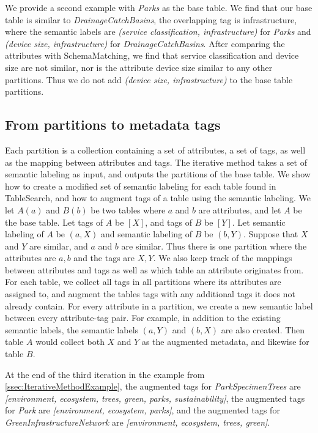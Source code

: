 We provide a second example with \textit{Parks} as the base table. We find that our base table is similar to \textit{DrainageCatchBasins}, the overlapping tag is infrastructure, where the semantic labels are \textit{(service classification, infrastructure)} for \textit{Parks} and \textit{(device size, infrastructure)} for \textit{DrainageCatchBasins}. After comparing the attributes with SchemaMatching, we find that service classification and device size are not similar, nor is the attribute device size similar to any other partitions. Thus we do not add \textit{(device size, infrastructure)} to the base table partitions.

\subsection{From partitions to metadata tags}
\label{ssec:FromPartitionsToMetadataTags}

Each partition is a collection containing a set of attributes, a set of tags, as well as the mapping between attributes and tags. The iterative method takes a set of semantic labeling as input, and outputs the partitions of the base table. We show how to create a modified set of semantic labeling for each table found in TableSearch, and how to augment tags of a table using the semantic labeling. We let $A(a)$ and $B(b)$ be two tables where $a$ and $b$ are attributes, and let $A$ be the base table. Let tags of $A$ be $[X]$, and tags of $B$ be $[Y]$. Let semantic labeling of $A$ be ${(a, X)}$ and semantic labeling of $B$ be ${(b, Y)}$. Suppose that $X$ and $Y$ are similar, and $a$ and $b$ are similar. Thus there is one partition where the attributes are ${a, b}$ and the tags are ${X, Y}$. We also keep track of the mappings between attributes and tags as well as which table an attribute originates from. For each table, we collect all tags in all partitions where its attributes are assigned to, and augment the tables tags with any additional tags it does not already contain. For every attribute in a partition, we create a new semantic label between every attribute-tag pair. For example, in addition to the existing semantic labels, the semantic labels $(a, Y)$ and $(b, X)$ are also created. Then table $A$ would collect both $X$ and $Y$ as the augmented metadata, and likewise for table $B$.

At the end of the third iteration in the example from \autoref{ssec:IterativeMethodExample}, the augmented tags for \textit{ParkSpecimenTrees} are \textit{[environment, ecosystem, trees, green, parks, sustainability]}, the augmented tags for \textit{Park} are \textit{[environment, ecosystem, parks]}, and the augmented tags for \textit{GreenInfrastructureNetwork} are \textit{[environment, ecosystem, trees, green]}.

